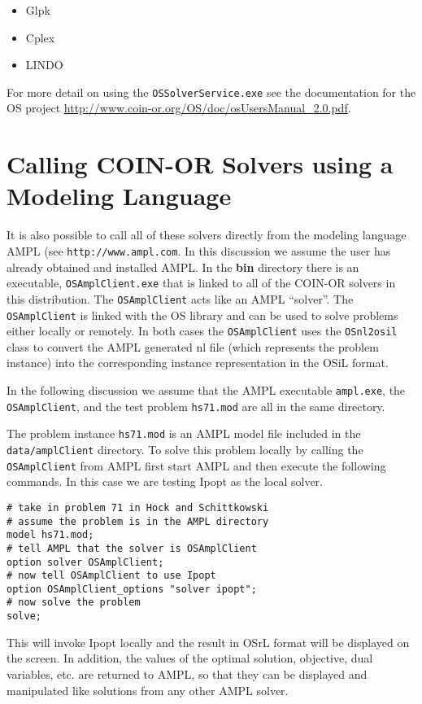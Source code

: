 \documentclass[11pt]{article}
\renewcommand{\{}{{\char"7B}}
\renewcommand{\}}{{\char"7D}}
\renewcommand{\^}{{\char"0D}}
\renewcommand{\'}{{\char"0D}}
\begin{document}
\begin{itemize}

 \item Glpk 

 \item Cplex 

 \item LINDO

\end{itemize}


For more detail on using the {\tt OSSolverService.exe} see the documentation for the OS project 
\url{http://www.coin-or.org/OS/doc/osUsersManual_2.0.pdf}.

\section{Calling COIN-OR  Solvers using a Modeling Language}\label{section:modellanguage}

It is also possible to call all of these solvers directly from the modeling language AMPL 
(see {\tt http://www.ampl.com}.  In this discussion we assume the user has already obtained and 
installed AMPL.  In the {\bf bin} directory there is an executable, {\tt OSAmplClient.exe} 
that is linked to all of the COIN-OR solvers in this distribution.   The {\tt OSAmplClient} acts 
like an AMPL ``solver''. The {\tt OSAmplClient} is linked with the OS library and can be used 
to solve problems either locally or remotely. In both cases the {\tt OSAmplClient} uses the
{\tt OSnl2osil} class to convert the AMPL generated nl 
file (which represents the problem instance) into the corresponding 
instance representation in the OSiL format.

In the following discussion we assume that the AMPL executable {\tt ampl.exe}, the {\tt OSAmplClient}, 
and the test problem {\tt hs71.mod} are all in the same directory.  

The  problem instance {\tt hs71.mod} is an AMPL model file included in the {\tt data/amplClient} directory.
To solve this problem locally by calling the {\tt OSAmplClient} from AMPL first start AMPL and then
execute the following commands. In this case we are testing  Ipopt as the
local solver.

\begin{verbatim}
# take in problem 71 in Hock and Schittkowski
# assume the problem is in the AMPL directory
model hs71.mod;
# tell AMPL that the solver is OSAmplClient
option solver OSAmplClient;
# now tell OSAmplClient to use Ipopt
option OSAmplClient_options "solver ipopt";
# now solve the problem
solve;
\end{verbatim}
This will invoke Ipopt locally and the result in OSrL format will be displayed on the screen.
In addition, the values of the optimal solution, objective, dual variables, etc. are returned to
AMPL, so that they can be displayed and manipulated like solutions from any other AMPL solver.
\end{document}
